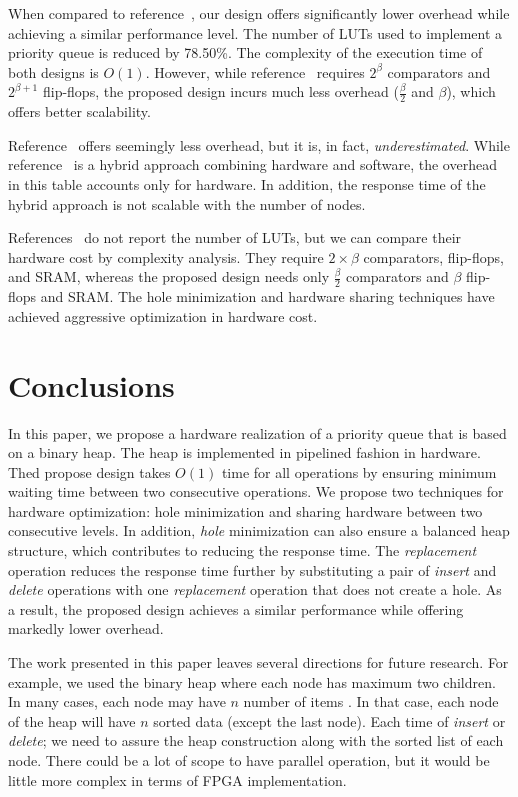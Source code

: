 \documentclass[10pt, conference, compsocconf]{IEEEtran}
\begin{document}
When compared to reference~\cite{hw8}, our design offers significantly lower overhead while achieving a similar performance level.
The number of LUTs used to implement a priority queue is reduced by 78.50\%.
The complexity of the execution time of both designs is $O(1)$.
However, while reference~\cite{hw8} requires $2^\beta$ comparators and $2^{\beta+1}$ flip-flops, the proposed design incurs much less overhead ($\frac{\beta}{2}$ and $\beta$), which offers better scalability.

Reference~\cite{hw11} offers seemingly less overhead, but it is, in fact, {\it underestimated}.
While reference~\cite{hw11} is a hybrid approach combining hardware and software, the overhead in this table accounts only for hardware.
In addition, the response time of the hybrid approach is not scalable with the number of nodes.

References~\cite{fpga1,hw2} do not report the number of LUTs, but we can compare their hardware cost by complexity analysis.
They require $2 \times \beta$ comparators, flip-flops, and SRAM, whereas the proposed design needs only $\frac{\beta}{2}$ comparators and $\beta$ flip-flops and SRAM.
The hole minimization and hardware sharing techniques have achieved aggressive optimization in hardware cost.



\section{Conclusions}

In this paper, we propose a hardware realization of a priority queue that is based on a binary heap.
The heap is implemented in pipelined fashion in hardware.
Thed propose design takes $O(1)$ time for all operations by ensuring minimum waiting time between two consecutive operations.
We propose two techniques for hardware optimization: hole minimization and sharing hardware between two consecutive levels.
In addition, {\it hole} minimization can also ensure a balanced heap structure, which contributes to reducing the response time.
The {\it replacement} operation reduces the response time further by substituting a pair of {\it insert} and {\it delete} operations with one {\it replacement } operation that does not create a hole.
As a result, the proposed design achieves a similar performance while offering markedly lower overhead.

The work presented in this paper leaves several directions for future research. For example, we used the binary heap where each node has maximum two children. In many cases, each node may have $n$ number of items \cite{pq3}. In that case, each node of the heap will have $n$ sorted data (except the last node). Each time of {\it insert} or {\it delete}; we need to assure the heap construction along with the sorted list of each node. There could be a lot of scope to have parallel operation, but it would be little more complex in terms of FPGA implementation.
\end{document}

